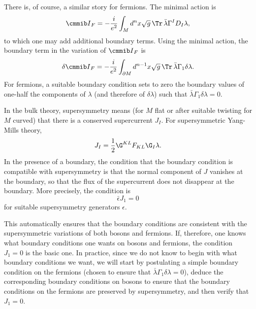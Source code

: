 There is, of course, a similar story for fermions. The minimal
action is %
\setcounter{equation}{3}
\begin{equation}\label{eq:olpo}
{{\cmmib I}}_F=-{i\over e^2}\int_M d^nx \sqrt
g\,\Tr\,{\bar\lambda} \Gamma^I D_I\lambda,
\end{equation}
 to which one may add
additional boundary terms. Using the minimal action, the boundary
term in the variation of ${{\cmmib I}}_F$ is %
\setcounter{equation}{4}
\begin{equation}\label{eq:rolpo}
\delta
{{\cmmib I}}_F=-{i\over e^2}\int_{\partial M}d^{n-1}x\sqrt
g\,\Tr\,{\bar \lambda} \Gamma_1\delta\lambda.
\end{equation}
  For fermions, a
suitable boundary condition sets to zero the boundary values of
one-half the components of $\lambda$ (and therefore of
$\delta\lambda$) such that ${\bar \lambda}
\Gamma_1\delta\lambda=0$.

In the bulk theory, supersymmetry means (for $M$ flat or after
suitable twisting for $M$ curved) that there is a conserved
supercurrent $J_I$. For supersymmetric Yang-Mills theory,
\setcounter{equation}{5}
\begin{equation}\label{eq:noggin}
J_I={1\over 2}\G^{KL}F_{KL}\G_I\lambda.
\end{equation}
 In the
presence of a boundary, the condition that the boundary condition
is compatible with supersymmetry is that the normal component of
$J$ vanishes at the boundary, so that the flux of the supercurrent
does not disappear at the boundary.  More precisely, the condition
is %
\setcounter{equation}{6}
\begin{equation}\label{eq:hobbo}
\bar \epsilon J_1=0
\end{equation}
 for suitable supersymmetry
generators $\epsilon$.

This automatically ensures that the boundary conditions are
consistent with the supersymmetric variations of both bosons and
fermions.  If, therefore, one knows what boundary conditions one
wants on bosons and fermions, the condition $J_1=0$ is the basic
one.  In practice, since we do not know to begin with what
boundary conditions we want, we will start by postulating a simple
boundary condition on the fermions (chosen to ensure that ${\bar
\lambda}\Gamma_1\delta\lambda=0$), deduce the corresponding
boundary conditions on bosons to ensure that the boundary
conditions on the fermions are preserved by supersymmetry, and
then verify that $J_1=0$.

